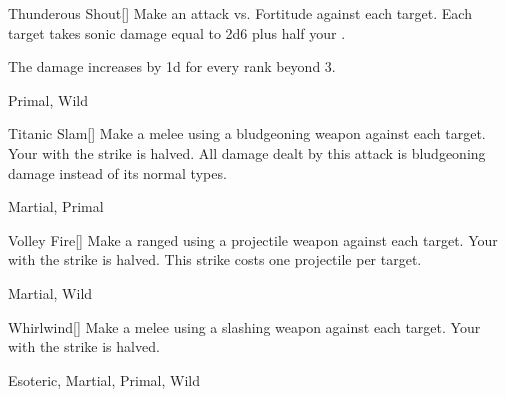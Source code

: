 \lowercase{\hypertarget{maneuver:Thunderous Shout}{}}\label{maneuver:Thunderous Shout}
\hypertarget{maneuver:Thunderous Shout}{}
\begin{freeability}[Rank 3]{Thunderous Shout}[]
Make an attack vs. Fortitude against each target.
\hit Each target takes sonic damage equal to 2d6 plus half your .

\rankline
The damage increases by \plus1d for every rank beyond 3.


 Primal, Wild
\end{freeability}
\vspace{0.25em}



\lowercase{\hypertarget{maneuver:Titanic Slam}{}}\label{maneuver:Titanic Slam}
\hypertarget{maneuver:Titanic Slam}{}
\begin{freeability}[Rank 3]{Titanic Slam}[]
Make a melee  using a bludgeoning weapon against each target.
Your  with the strike is halved.
All damage dealt by this attack is bludgeoning damage instead of its normal types.


 Martial, Primal
\end{freeability}
\vspace{0.25em}



\lowercase{\hypertarget{maneuver:Volley Fire}{}}\label{maneuver:Volley Fire}
\hypertarget{maneuver:Volley Fire}{}
\begin{freeability}[Rank 3]{Volley Fire}[]
Make a ranged  using a projectile weapon against each target.
Your  with the strike is halved.
This strike costs one projectile per target.


 Martial, Wild
\end{freeability}
\vspace{0.25em}



\lowercase{\hypertarget{maneuver:Whirlwind}{}}\label{maneuver:Whirlwind}
\hypertarget{maneuver:Whirlwind}{}
\begin{freeability}[Rank 3]{Whirlwind}[]
Make a melee  using a slashing weapon against each target.
Your  with the strike is halved.


 Esoteric, Martial, Primal, Wild
\end{freeability}
\vspace{0.25em}


